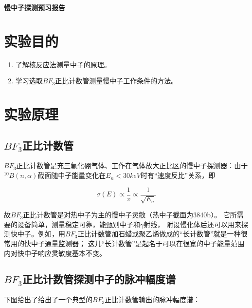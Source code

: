 \documentclass[a4paper,UTF8]{ctexart}
\begin{document}
\begin{center}
    \textbf{\Large 慢中子探测预习报告}
    \par {}
\end{center}

\section{实验目的}

\begin{enumerate}
    \item 了解核反应法测量中子的原理。
    \item 学习选取$BF_3$正比计数管测量慢中子工作条件的方法。
\end{enumerate}

\section{实验原理}

\subsection{$BF_3$正比计数管}

$BF_3$正比计数管是充三氟化硼气体、工作在气体放大正比区的慢中子探测器：由于$^{10}B(n,\alpha)$截面随中子能量变化在$E_n < 30keV$时有“速度反比”关系，即

\begin{equation}
    \sigma(E) \propto \frac{1}{v} \propto \frac{1}{\sqrt{E_n}}
\end{equation}

故$BF_3$正比计数管是对热中子为主的慢中子灵敏（热中子截面为3840b）。
它所需要的设备简单，测量稳定可靠，能甄别中子和$\gamma$射线，
附设慢化体后还可以用来探测快中子。例如，用$BF_3$正比计数管加石蜡或聚乙烯做成的“长计数管”就是一种很常用的快中子通量监测器；
这儿“长计数管”是起名于可以在很宽的中子能量范围内对快中子响应灵敏度基本不变。

\subsection{$BF_3$正比计数管探测中子的脉冲幅度谱}

下图给出了给出了一个典型的$BF_3$正比计数管输出的脉冲幅度谱：
\end{document}
